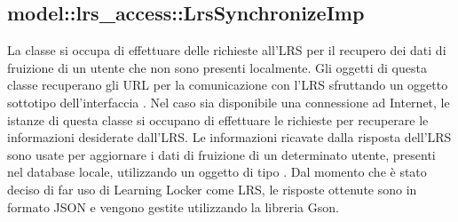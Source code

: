 \documentclass[../Tesi.tex]{subfiles}
\begin{document}
		\subsection{model::lrs\_access::LrsSynchronizeImp}
		La classe  si occupa di effettuare delle richieste all'LRS per 
		il recupero dei dati di fruizione di un utente che non sono presenti localmente. Gli oggetti di questa classe recuperano gli URL per la comunicazione con l'LRS sfruttando un oggetto sottotipo dell'interfaccia . Nel caso sia disponibile una connessione ad Internet, le istanze di questa classe si occupano di effettuare le richieste per recuperare le informazioni desiderate dall'LRS. Le informazioni ricavate dalla risposta dell'LRS sono usate per aggiornare i dati di fruizione di un determinato utente, presenti nel database locale, utilizzando un oggetto di tipo . Dal momento che è stato deciso di far uso di Learning Locker come LRS, le risposte ottenute sono in formato JSON e vengono gestite utilizzando la libreria Gson.
\end{document}
